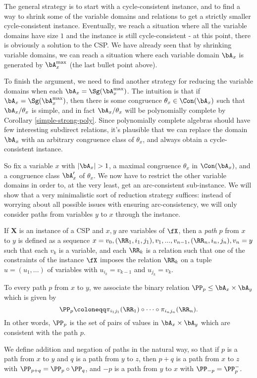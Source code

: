 The general strategy is to start with a cycle-consistent instance, and to find a way to shrink some of the variable domains and relations to get a strictly smaller cycle-consistent instance. Eventually, we reach a situation where all the variable domains have size $1$ and the instance is still cycle-consistent - at this point, there is obviously a solution to the CSP. We have already seen that by shrinking variable domains, we can reach a situation where each variable domain $\bA_x$ is generated by $\bA_x^{\max}$ (the last bullet point above).

To finish the argument, we need to find another strategy for reducing the variable domains when each $\bA_x = \Sg(\bA_x^{\max})$. The intuition is that if $\bA_x = \Sg(\bA_x^{\max})$, then there is some congruence $\theta_x \in \Con(\bA_x)$ such that $\bA_x/\theta_x$ is simple, and in fact $\bA_x/\theta_x$ will be polynomially complete by Corollary \ref{simple-strong-poly}. Since polynomially complete algebras should have few interesting subdirect relations, it's plausible that we can replace the domain $\bA_x$ with an arbitrary congruence class of $\theta_x$, and always obtain a cycle-consistent instance.

So fix a variable $x$ with $|\bA_x| > 1$, a maximal congruence $\theta_x$ in $\Con(\bA_x)$, and a congruence class $\bA_x'$ of $\theta_x$. We now have to restrict the other variable domains in order to, at the very least, get an arc-consistent sub-instance. We will show that a very minimalistic sort of reduction strategy suffices: instead of worrying about all possible issues with ensuring arc-consistency, we will only consider paths from variables $y$ to $x$ through the instance.

\begin{defn}\label{path-defn} If $\mathbf{X}$ is an instance of a CSP and $x,y$ are variables of $\fX$, then a \emph{path} $p$ from $x$ to $y$ is defined as a sequence $x = v_0, (\RR_1,i_1,j_1), v_1, ..., v_{n-1}, (\RR_n,i_n,j_n), v_n = y$ such that each $v_k$ is a variable, and each $\RR_k$ is a relation such that one of the constraints of the instance $\fX$ imposes the relation $\RR_k$ on a tuple $u = (u_1, ...)$ of variables with $u_{i_k} = v_{k-1}$ and $u_{j_k} = v_k$.

To every path $p$ from $x$ to $y$, we associate the binary relation $\PP_p \le \bA_x \times \bA_y$ which is given by
\[
\PP_p \coloneqq \pi_{i_1j_1}(\RR_1) \circ \cdots \circ \pi_{i_nj_n}(\RR_n).
\]
In other words, $\PP_p$ is the set of pairs of values in $\bA_x \times \bA_y$ which are consistent with the path $p$.

We define addition and negation of paths in the natural way, so that if $p$ is a path from $x$ to $y$ and $q$ is a path from $y$ to $z$, then $p+q$ is a path from $x$ to $z$ with $\PP_{p+q} = \PP_p \circ \PP_q$, and $-p$ is a path from $y$ to $x$ with $\PP_{-p} = \PP_p^-$.
\end{defn}

